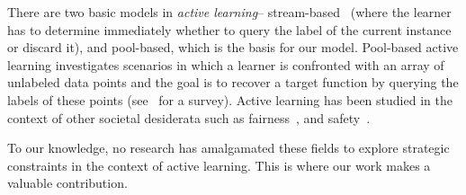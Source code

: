 There are two basic models in \textit{active learning}-- stream-based~\citep{FreundSST97} (where the learner has to determine immediately whether to query the label of the current instance  or discard it), and pool-based, which is the basis for our model. Pool-based active learning investigates scenarios in which a learner is confronted with an array of unlabeled data points and the goal is to recover a target function by querying the labels of these points (see~\citep{Hanneke14survey} for a survey). Active learning has been studied in the context of other societal desiderata such as  fairness~\citep{ShenCW22}, and safety~\citep{CamilleriWMJJ22}. 


To our knowledge, no research has amalgamated these fields to explore strategic constraints in the context of active learning. This is where our work makes a valuable contribution.




